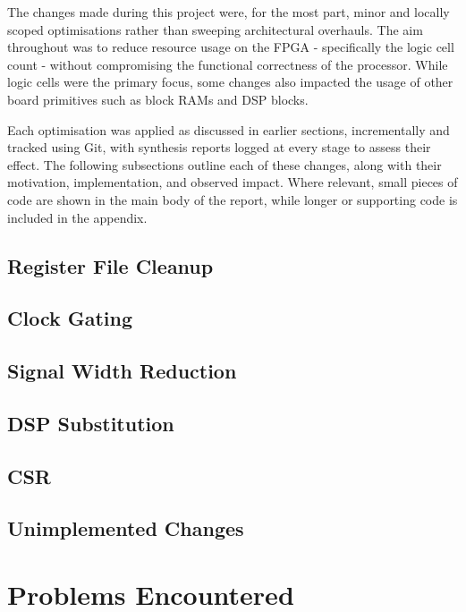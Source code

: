 \documentclass[a4paper,10pt]{article}
\begin{document}
The changes made during this project were, for the most part, 
minor and locally scoped optimisations rather than sweeping architectural overhauls. 
The aim throughout was to reduce resource usage on the FPGA - 
specifically the logic cell count  - 
without compromising the functional correctness of the processor. 
While logic cells were the primary focus, 
some changes also impacted the usage of other board primitives 
such as block RAMs and DSP blocks. 

Each optimisation was applied as discussed in earlier sections,
incrementally and tracked using Git, 
with synthesis reports logged at every stage to assess their effect. 
The following subsections outline each of these changes, 
along with their motivation, implementation, and observed impact. 
Where relevant, small pieces of code are shown in the main body of the report, 
while longer or supporting code is included in the appendix.

\subsection{Register File Cleanup}
\label{sec:Reg}

\subsection{Clock Gating}
\label{sec:Gating}

\subsection{Signal Width Reduction}
\label{sec:Signal_Width}

\subsection{DSP Substitution}
\label{sec:DSP}

\subsection{CSR}
\label{sec:CSR}

\subsection{Unimplemented Changes}
\label{sec:Unimplemented_Changes}

\section{Problems Encountered}
\label{sec:Problems_Encountered}
\end{document}
